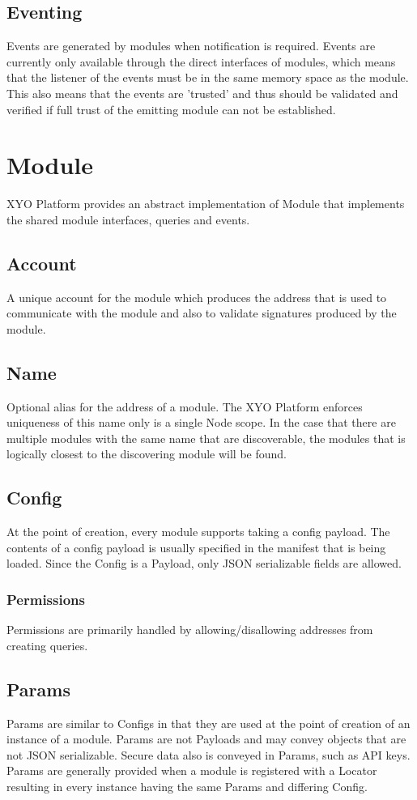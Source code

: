 \documentclass{article}
\begin{document}
\subsection{Eventing}
Events are generated by modules when notification is required.  Events are currently only available through the direct interfaces of modules, which means that the listener of the events must be in the same memory space as the module.  This also means that the events are 'trusted' and thus should be validated and verified if full trust of the emitting module can not be established. 

\section{Module}
XYO Platform provides an abstract implementation of Module that implements the shared module interfaces, queries and events.
\subsection{Account}
A unique account for the module which produces the address that is used to communicate with the module and also to validate signatures produced by the module.
\subsection{Name}
Optional alias for the address of a module.  The XYO Platform enforces uniqueness of this name only is a single Node scope.  In the case that there are multiple modules with the same name that are discoverable, the modules that is logically closest to the discovering module will be found.

\subsection{Config}
At the point of creation, every module supports taking a config payload.  The contents of a config payload is usually specified in the manifest that is being loaded.  Since the Config is a Payload, only JSON serializable fields are allowed.
\subsubsection{Permissions}
Permissions are primarily handled by allowing/disallowing addresses from creating queries.
\subsection{Params}
Params are similar to Configs in that they are used at the point of creation of an instance of a module.  Params are not Payloads and may convey objects that are not JSON serializable.  Secure data also is conveyed in Params, such as API keys.  Params are generally provided when a module is registered with a Locator resulting in every instance having the same Params and differing Config.
\end{document}

